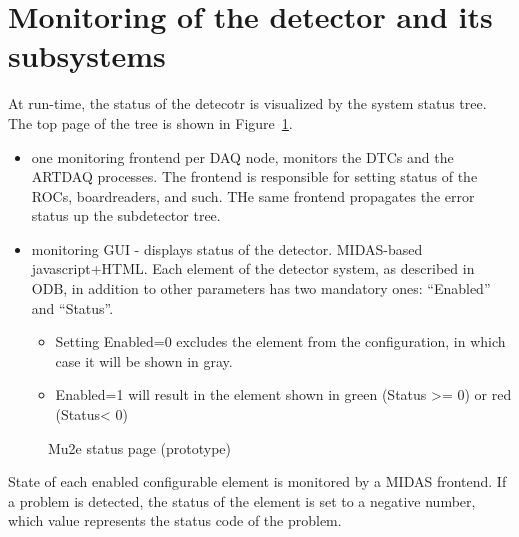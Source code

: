 \section{Monitoring of the detector and its subsystems}

At run-time, the status of the detecotr is visualized by the system status tree.
The top page of the tree is shown in Figure~\ref{figure:mu2e_status_page}.

\begin{itemize}
\item
  one monitoring frontend per DAQ node, monitors the DTCs and the ARTDAQ processes.
  The frontend is responsible for setting status of the ROCs, boardreaders, and such.
  THe same frontend propagates the error status up the subdetector tree. 
  \item
  monitoring GUI - displays status of the detector. MIDAS-based javascript+HTML.
  Each element of the detector system, as described in ODB, in addition to other parameters
  has two mandatory ones: ``Enabled'' and ``Status''.
  \begin{itemize}
  \item 
    Setting Enabled=0 excludes the element from the configuration, in which case it will be
    shown in gray.
  \item
    Enabled=1 will result in the element shown in green (Status >= 0) or red (Status< 0) 
  \end{itemize}
\end{itemize}

\begin{figure}[H]
  \caption{
    \label{figure:mu2e_status_page}
    Mu2e status page (prototype)
  }
\end{figure}

State of each enabled configurable element is monitored by a MIDAS frontend.
If a problem is detected, the status of the element is set to a negative
number, which value represents the status code of the problem.

